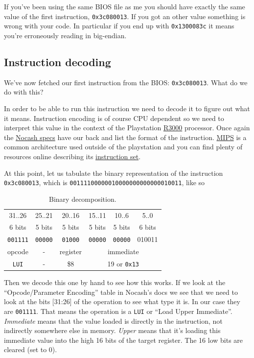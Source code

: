 \documentclass[a4paper]{article}
\newcommand{\code}[1] {\texttt{#1}}
\begin{document}
If you've been using the same BIOS file as me you should have exactly
the same value of the first instruction, \code{0x3c080013}. If you got an
other value something is wrong with your code. In particular if you end
up with \code{0x1300083c} it means you're erroneously reading in big-endian.

\subsection{Instruction decoding}

We've now fetched our first instruction from the BIOS:
\code{0x3c080013}. What do we do with this?

In order to be able to run this instruction we need to decode it to
figure out what it means. Instruction encoding is of course CPU
dependent so we need to interpret this value in the context of the
Playstation \href{https://en.wikipedia.org/wiki/R3000}{R3000}
processor. Once again the
\href{http://problemkaputt.de/psx-spx.htm#cpuspecifications}{Nocash
  specs} have our back and list the format of the
instruction. \href{https://en.wikipedia.org/wiki/MIPS_instruction_set}{MIPS}
is a common architecture used outside of the playstation and you can
find plenty of resources online describing its \href{https://en.wikipedia.org/wiki/Instruction_set}{instruction set}.

At this point, let us tabulate the binary representation of the instruction
\code{0x3c080013}, which is \code{00111100000010000000000000010011}, like so

\begin{table}[ht]
  \centering

  \begin{tabular}{ c | c | c | c | c | c }
    31..26 & 25..21 & 20..16 & 15..11 & 10..6  & 5..0  \\
    6 bits & 5 bits & 5 bits & 5 bits & 5 bits & 6 bits\\
    \hline
    \code{001111} & \code{00000} & \code{01000} & \code{00000}
                                      & \code{00000} & {010011} \\
    opcode & - & register & \multicolumn{3}{c}{immediate} \\
    \code{LUI} & - & \$8 & \multicolumn{3}{c}{19 or \code{0x13}} 
  \end{tabular}

  \caption{Binary decomposition.}
  \label{tab:bd}
\end{table}

Then we decode this one by hand to see how this works. If we look at the
``Opcode/Parameter Encoding'' table in Nocash's docs we see that we
need to look at the bits [31:26] of the operation to see what type it
is. In our case they are \code{001111}. That means the operation is
a \code{LUI} or ``Load Upper Immediate''. \emph{Immediate} means
that the value loaded is directly in the instruction, not indirectly
somewhere else in memory. \emph{Upper} means that it's loading this
immediate value into the high 16 bits of the target register. The 16
low bits are cleared (set to 0).
\end{document}
